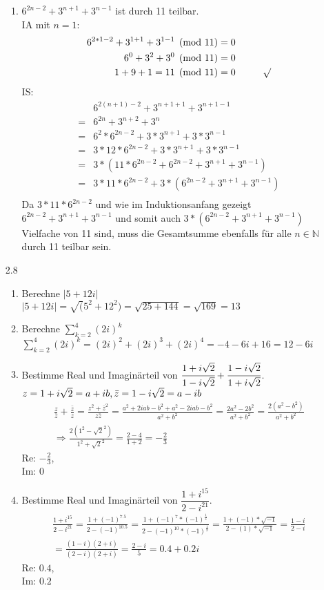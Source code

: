\documentclass[12pt,letterpaper]{article}
\newcommand{\alignleft}[1]{\tag*{\llap{\makebox[\linewidth][l]{$#1$}}}}
\newcommand{\LLeftrightarrow}{ \alignleft{\Leftrightarrow}}
\newcommand{\Eqn}[3]{#1 &#2 #3}
\newcommand{\eqnf}[2]{\Eqn{#1}{=}{#2}\\}
\newcommand{\eqn}[2]{\LLeftrightarrow\Eqn{#1}{=}{#2}\\}
\begin{document}
\begin{enumerate}
\begin{enumerate}
\item $6^{2n-2}+3^{n+1}+3^{n-1}$ ist durch 11 teilbar.\\
IA mit $n=1$: 
\begin{align*}
\eqnf{6^{2*1-2}+3^{1+1}+3^{1-1} \pmod{11}}{0}
\eqn{6^0+3^2+3^0 \pmod{11}}{0}
\eqn{1+9+1 = 11 \pmod{11}}{0\makebox[1cm]{}\surd}
\end{align*}
IS:
\begin{align*}
&6^{2(n+1)-2}+3^{n+1+1}+3^{n+1-1}\\
= &6^{2n}+3^{n+2}+3^{n}\\
= &6^2*6^{2n-2}+3*3^{n+1}+3*3^{n-1}\\ 
= &3*12*6^{2n-2}+3*3^{n+1}+3*3^{n-1}\\
= &3*(11*6^{2n-2}+6^{2n-2}+3^{n+1}+3^{n-1})\\
= &3*11*6^{2n-2}+ 3*(6^{2n-2}+3^{n+1}+3^{n-1})\\
\end{align*}
Da $3*11*6^{2n-2}$ und wie im Induktionsanfang gezeigt $6^{2n-2}+3^{n+1}+3^{n-1}$ und somit auch $3*(6^{2n-2}+3^{n+1}+3^{n-1})$ Vielfache von 11 sind, muss die Gesamtsumme ebenfalls für alle $n\in\mathbb{N}$ durch 11 teilbar sein.
\end{enumerate}
\item [2.8]
\begin{enumerate}
\item Berechne $|5+12i|$\\
$|5+12i| = \sqrt(5^2+12^2) = \sqrt{25+144} = \sqrt{169} = 13$
\item Berechne $\sum\limits_{k=2}^{4}(2i)^k$\\
$\sum\limits_{k=2}^{4}(2i)^k = (2i)^2+(2i)^3+(2i)^4 = -4-6i+16 = 12-6i$
\item Bestimme Real und Imaginärteil von $\cfrac{1+i\sqrt{2}}{1-i\sqrt{2}}+\cfrac{1-i\sqrt{2}}{1+i\sqrt{2}}$.\\
$z = 1+i\sqrt{2} = a+ib,\\
\bar{z} = 1-i\sqrt{2} = a-ib$
\begin{align*}
\frac{z}{\bar{z}}+\frac{\bar{z}}{z} = \frac{z^2+\bar{z}^2}{z\bar{z}} = \frac{a^2+2iab-b^2+a^2-2iab-b^2}{a^2+b^2} = \frac{2a^2-2b^2}{a^2+b^2} = \frac{2(a^2-b^2)}{a^2+b^2}\\
\Rightarrow\frac{2(1^2-\sqrt{2}^2)}{1^2+\sqrt{2}^2}=\frac{2-4}{1+2} = -\frac{2}{3}
\end{align*}
Re: $-\frac{2}{3}$,\\
Im: $0$
\item Bestimme Real und Imaginärteil von $\dfrac{1+i^{15}}{2-i^{21}}$.
\begin{align*}
\frac{1+i^{15}}{2-i^{21}} = \frac{1+(-1)^{7.5}}{2-(-1)^{10.5}} = \frac{1+(-1)^7*(-1)^{\frac{1}{2}}}{2-(-1)^{10}*(-1)^{\frac{1}{2}}} = \frac{1+(-1)*\sqrt{-1}}{2-(1)*\sqrt{-1}} = \frac{1-i}{2-i}\\
=\frac{(1-i)(2+i)}{(2-i)(2+i)} = \frac{2-i}{5} = 0.4+0.2i
\end{align*}
Re: $0.4$,\\
Im: $0.2$
\end{enumerate}
\end{enumerate}
\end{document}
